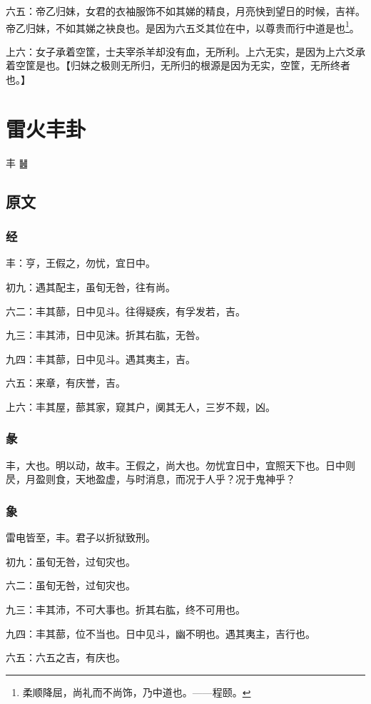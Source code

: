 \documentclass[12pt,oneside]{book}
\begin{document}
六五：帝乙归妹，女君的衣袖服饰不如其娣的精良，月亮快到望日的时候，吉祥。帝乙归妹，不如其娣之袂良也。是因为六五爻其位在中，以尊贵而行中道是也\footnote{柔顺降屈，尚礼而不尚饰，乃中道也。——程颐。}。

上六：女子承着空筐，士夫宰杀羊却没有血，无所利。上六无实，是因为上六爻承着空筐是也。【归妹之极则无所归，无所归的根源是因为无实，空筐，无所终者也。】



\chapter{雷火丰卦}
丰 {\Large ䷶}

\section{原文}

\subsection{经}
丰：亨，王假之，勿忧，宜日中。

初九：遇其配主，虽旬无咎，往有尚。

六二：丰其蔀，日中见斗。往得疑疾，有孚发若，吉。

九三：丰其沛，日中见沫。折其右肱，无咎。

九四：丰其蔀，日中见斗。遇其夷主，吉。

六五：来章，有庆誉，吉。

上六：丰其屋，蔀其家，窥其户，阒其无人，三岁不觌，凶。

\subsection{彖}
丰，大也。明以动，故丰。王假之，尚大也。勿忧宜日中，宜照天下也。日中则昃，月盈则食，天地盈虚，与时消息，而况于人乎？况于鬼神乎？

\subsection{象}
雷电皆至，丰。君子以折狱致刑。

初九：虽旬无咎，过旬灾也。

六二：虽旬无咎，过旬灾也。

九三：丰其沛，不可大事也。折其右肱，终不可用也。

九四：丰其蔀，位不当也。日中见斗，幽不明也。遇其夷主，吉行也。

六五：六五之吉，有庆也。
\end{document}
